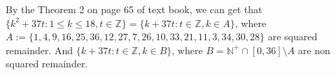\documentclass{ctexart}
\begin{document}
\begin{solution}
By the Theorem 2 on page 65 of text book, we can get that \(\{k^2 + 37t:1 \leq k \leq 18, t \in \mathbb{Z}\}=\{k + 37 t: t \in \mathbb{Z}, k \in A\}\), 
where \(A:=\{1,4,9,16,25,36,12,27,7,26,10,33,21,11,3,34,30,28\}\) are squared remainder. 
And \(\{k + 37t: t \in \mathbb{Z}, k \in B\}\), where \(B=\mathbb{N}^+ \cap[0,36] \setminus A\) are non 
squared remainder.
\end{solution}
\begin{problem}\label{pro:4}
  
\end{problem}
\end{document}
